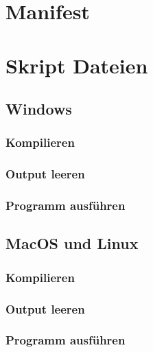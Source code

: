 \section{Manifest}

\clearpage
%
\section{Skript Dateien}
\subsection{Windows}
\subsubsection{Kompilieren}

\clearpage
%
\subsubsection{Output leeren}

\clearpage
%
\subsubsection{Programm ausführen}

\clearpage
%
\subsection{MacOS und Linux}
\subsubsection{Kompilieren}

\clearpage
%
\subsubsection{Output leeren}

\clearpage
%
\subsubsection{Programm ausführen}

\cleardoublepage